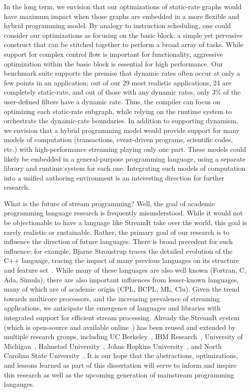 In the long term, we envision that our optimizations of static-rate
graphs would have maximum impact when those graphs are embedded in a
more flexible and hybrid programming model.  By analogy to instruction
scheduling, one could consider our optimizations as focusing on the
basic block: a simple yet pervasive construct that can be stitched
together to perform a broad array of tasks.  While support for complex
control flow is important for functionality, aggressive optimization
within the basic block is essential for high performance.  Our
benchmark suite supports the premise that dynamic rates often occur at
only a few points in an application; out of our 29 most realistic
applications, 24 are completely static-rate, and out of those with any
dynamic rates, only 3\% of the user-defined filters have a dynamic
rate.  Thus, the compiler can focus on optimizing each static-rate
subgraph, while relying on the runtime system to orchestrate the
dynamic-rate boundaries.  In addition to supporting dynamism, we
envision that a hybrid programming model would provide support for
many models of computation (transactions, event-driven programs,
scientific codes, etc.) with high-performance streaming playing only
one part.  These models could likely be embedded in a general-purpose
programming language, using a separate library and runtime system for
each one.  Integrating such models of computation into a unified
authoring environment is an interesting direction for further
research.

What is the future of stream programming?  Well, the goal of academic
programming language research is frequently misunderstood.  While it
would not be objectionable to have a language like StreamIt take over
the world, this goal is rarely realistic or sustainable.  Rather, the
primary goal of our research is to influence the direction of future
languages.  There is broad precedent for such influence; for example,
Bjarne Stroustrup traces the detailed evolution of the C++ language,
tracing the impact of many previous languages on its structure and
feature set~\cite{stroustrup_design_1994}.  While many of these
languages are also well known (Fortran, C, Ada, Simula), there are
also important influences from lesser-known languages, many of which
are of academic origin (CPL, BCPL, ML, Clu).  Given the trend towards
multicore processors, and the increasing prevalence of streaming
applications, we anticipate the emergence of languages and libraries
with integrated support for efficient stream processing.  Already the
StreamIt system (which is open-source and available
online~\cite{streamitweb}) has been reused and extended by multiple
research groups, including UC
Berkeley~\cite{mani-permutations,bit-streaming}, IBM
Research~\cite{huang_liquid_2008,hormati_optimus:_2008}, University of
Michigan~\cite{kudlur_orchestratingexecution_2008,hormati_optimus:_2008},
Halmstad University~\cite{ola-techrep,andersson_model_07}, Johns
Hopkins University~\cite{duca-thesis}, and North Carolina State
University~\cite{won-thesis}.  It is our hope that the abstractions,
optimizations, and lessons learned as part of this dissertation will
serve to inform and inspire this research as well as the upcoming
generation of mainstream programming langauges.

